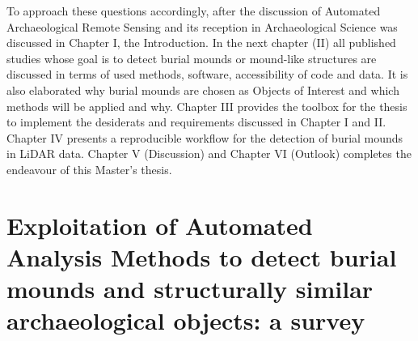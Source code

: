 \documentclass[
]{article}
\begin{document}
To approach these questions accordingly, after the discussion of Automated Archaeological Remote Sensing and its reception in Archaeological Science was discussed in Chapter I, the Introduction. In the next chapter (II) all published studies whose goal is to detect burial mounds or mound-like structures are discussed in terms of used methods, software, accessibility of code and data. It is also elaborated why burial mounds are chosen as Objects of Interest and which methods will be applied and why. Chapter III provides the toolbox for the thesis to implement the desiderats and requirements discussed in Chapter I and II. Chapter IV presents a reproducible workflow for the detection of burial mounds in LiDAR data. Chapter V (Discussion) and Chapter VI (Outlook) completes the endeavour of this Master's thesis.

\newpage

\hypertarget{exploitation-of-automated-analysis-methods-to-detect-burial-mounds-and-structurally-similar-archaeological-objects-a-survey}{%
\section{Exploitation of Automated Analysis Methods to detect burial mounds and structurally similar archaeological objects: a survey}\label{exploitation-of-automated-analysis-methods-to-detect-burial-mounds-and-structurally-similar-archaeological-objects-a-survey}}
\end{document}

